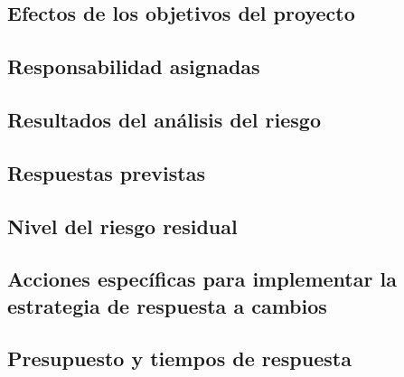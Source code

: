 \documentclass[11pt,a4paper,spanish,twoside]{book}
\begin{document}
\subsection{Efectos de los objetivos del proyecto}
\subsection{Responsabilidad asignadas}
\subsection{Resultados del análisis del riesgo}
\subsection{Respuestas previstas}
\subsection{Nivel del riesgo residual}
\subsection{Acciones específicas para implementar la estrategia de respuesta
a cambios}
\subsection{Presupuesto y tiempos de respuesta}
\end{document}
